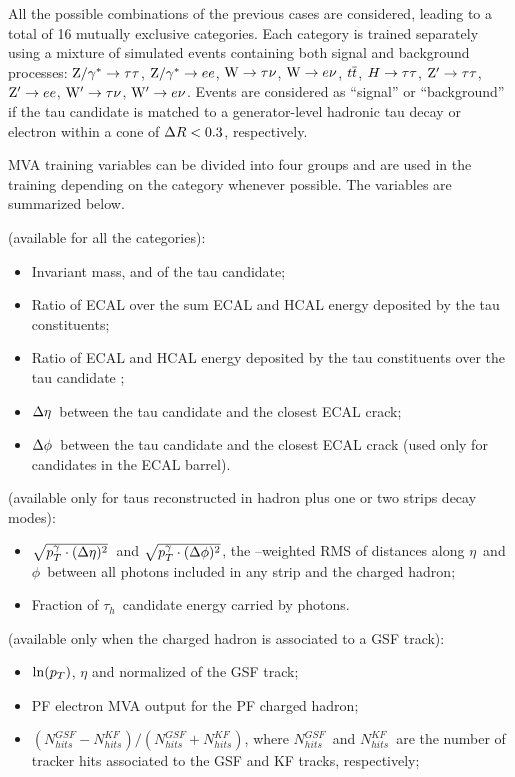 All the possible combinations of the previous cases are considered, leading to a total of 16 mutually exclusive categories. Each category is trained separately using a mixture of  simulated events containing both signal and background processes: $\mathrm{Z}/\gamma^*\rightarrow\tau\tau$, $\mathrm{Z}/\gamma^*\rightarrow ee$, $\mathrm{W}\rightarrow \tau\nu$, $\mathrm{W}\rightarrow e\nu$, $t\overline{t}$, $H\rightarrow\tau\tau$, $\mathrm{Z}'\rightarrow\tau\tau$, $\mathrm{Z}'\rightarrow ee$, $\mathrm{W}'\rightarrow \tau\nu$, $\mathrm{W}'\rightarrow e\nu$. Events are considered as ``signal'' or ``background'' if the tau candidate is matched to a generator-level hadronic tau decay or electron within a cone of $\Delta R < 0.3$, respectively. 

MVA training variables can be divided into four groups and are used in the training depending on the category whenever possible. The variables are summarized below.

 (available for all the categories):
\begin{itemize}
\item Invariant mass, \pT and \Eta of the tau candidate;
\item Ratio of ECAL over the sum ECAL and HCAL energy deposited by the tau constituents;
\item Ratio of ECAL and HCAL energy deposited by the tau constituents over the tau candidate \pT;
\item $\Delta\eta$\ between the tau candidate and the closest ECAL crack;
\item $\Delta\phi$\ between the tau candidate and the closest ECAL crack (used only for candidates in the ECAL barrel).
\end{itemize}

 (available only for taus reconstructed in hadron plus one or two strips decay modes):
\begin{itemize}
\item $\sqrt{p_{T}^{\gamma} \cdot (\Delta\eta)^{2}}$\ and $\sqrt{p_{T}^{\gamma} \cdot (\Delta\phi)^{2}}$, 
  the \pT--weighted RMS of distances along $\eta$\ and $\phi$\ between all photons included in any strip and the charged hadron;
\item Fraction of $\tau_{h}$\ candidate energy carried by photons.
\end{itemize}

 (available only when the charged hadron is associated to a GSF track):
\begin{itemize}
\item $\ln (p_{T})$, $\eta$ and normalized \chisq of the GSF track;
\item PF electron MVA output for the PF charged hadron;
\item $(N_{hits}^{GSF} - N_{hits}^{KF})/(N_{hits}^{GSF} + N_{hits}^{KF})$, where $N_{hits}^{GSF}$\ and $N_{hits}^{KF}$\ are the number of tracker hits associated to the GSF and KF tracks, respectively;
\end{itemize}

